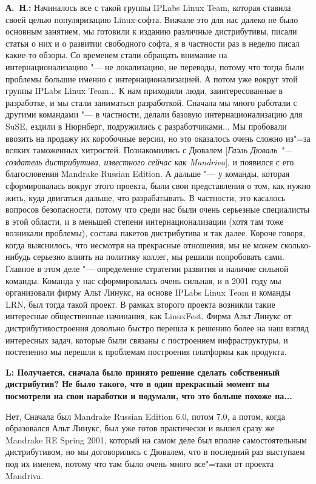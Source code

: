 \documentclass[10pt, a5paper]{article}
\begin{document}
{\noindent \bf А.~Н.:} Начиналось все с такой группы IPLabs Linux Team, которая ставила своей целью популяризацию Linux-софта. Вначале это для нас далеко не было основным занятием, мы готовили к изданию различные дистрибутивы, писали статьи о них и о развитии свободного софта, я в частности раз в неделю писал какие-то обзоры. Со временем стали обращать внимание на интернационализацию "--- не локализацию, не переводы, потому что тогда были проблемы большие именно с  интернационализацией. А потом уже вокруг этой группы  IPLabs Linux Team... К нам приходили люди, заинтересованные в разработке, и мы стали заниматься разработкой. Сначала мы много работали с другими командами "--- в частности, делали базовую интернационализацию для SuSE, ездили в Нюрнберг, подружились с разработчиками... Мы пробовали ввозить на продажу их коробочные версии, но это оказалось очень сложно из"=за всяких таможенных хитростей. Познакомились с Дювалем [\emph{Гаэль Дюваль "--- создатель дистрибутива, известного сейчас как Mandriva}], и появился с его благословения Mandrake Russian Edition. А дальше "--- у команды, которая сформировалась вокруг этого проекта, были свои представления о том, как нужно жить, куда двигаться дальше, что разрабатывать. В частности, это касалось вопросов безопасности, потому что среди нас были очень серьезные специалисты в этой области, и в меньшей степени интернационализации (хотя там тоже возникали проблемы),  состава пакетов дистрибутива и так далее. Короче говоря, когда выяснилось, что несмотря на прекрасные отношения, мы не можем сколько-нибудь серьезно влиять на политику коллег, мы решили попробовать сами. Главное в этом деле "--- определение стратегии развития и наличие сильной команды. Команда у нас сформировалась очень сильная, и в 2001 году мы организовали фирму Альт Линукс, на основе  IPLabs Linux Team и команды LRN, был тогда такой проект. В рамках второго проекта возникли такие интересные общественные начинания, как LinuxFest. Фирма Альт Линукс от дистрибутивостроения довольно быстро перешла к решению более на наш взгляд интересных задач, которые были связаны с построением инфраструктуры, и постепенно мы перешли к проблемам построения платформы как продукта. 

{\noindent \bf L: Получается, сначала было принято решение сделать собственный дистрибутив? Не было такого, что в один прекрасный момент вы посмотрели на свои наработки и подумали, что это больше похоже на...}

\noindent Нет, Сначала был  Mandrake Russian Edition 6.0, потом 7.0, а потом, когда образовался Альт Линукс, был уже готов практически и вышел сразу же Mandrake RE Spring 2001, который на самом деле был вполне самостоятельным дистрибутивом, но мы договорились с Дювалем, что в последний раз выступаем под их именем, потому что там было очень много все"=таки от проекта Mandriva. 
\end{document}

